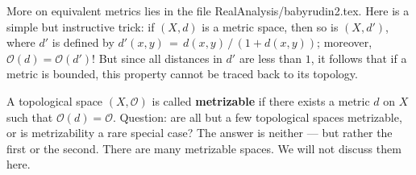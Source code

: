 \documentclass[11pt]{article}
\renewcommand{\O}{\mathcal{O}}
\begin{document}
More on equivalent metrics lies in the file RealAnalysis/babyrudin2.tex. Here is a simple but instructive trick: if $(X, d)$ is a metric space, then so is $(X, d')$, where $d'$ is defined by $d'(x, y) \, = \, d(x, y) \, / \, (1 + d(x, y))$; moreover, $\O(d) = \O(d')$! But since all distances in $d'$ are less than $1$, it follows that if a metric is bounded, this property cannot be traced back to its topology.

A topological space $(X, \O)$ is called \textbf{metrizable} if there exists a metric $d$ on $X$ such that $\O(d) = \O$. Question: are all but a few topological spaces metrizable, or is metrizability a rare special case? The answer is neither --- but rather the first or the second. There are many metrizable spaces. We will not discuss them here.

\end{document}
